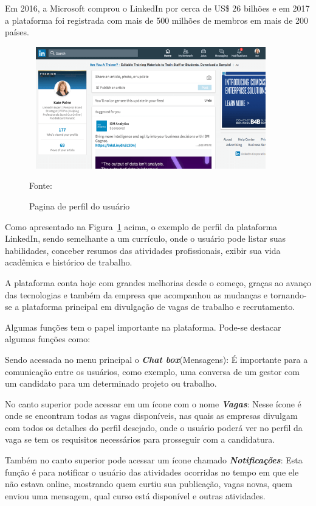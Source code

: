 Em 2016, a Microsoft comprou o LinkedIn por cerca de US\$ 26 bilhões e em 2017 a plataforma foi registrada com mais de 500 milhões de membros em mais de 200 países.

\begin{figure}[!h]
	\centering
	\caption{Pagina de perfil do usuário }
	\includegraphics[width=400px, height=200px]{./images/linkedin1.png}
		\label{fig:Pagina}
	\par {Fonte: \cite{linkedin}}
\end{figure}

Como apresentado na Figura~\hypersetup{linkcolor=black}\ref{fig:Pagina} acima, o exemplo de perfil da plataforma LinkedIn, sendo semelhante a um currículo, onde o usuário pode listar suas habilidades, conceber resumos das atividades profissionais, exibir sua vida acadêmica e histórico de trabalho.
 
A plataforma conta hoje com grandes melhorias desde o começo, graças ao avanço das tecnologias e também da empresa que acompanhou as mudanças e tornando-se a plataforma principal em divulgação de vagas de trabalho e recrutamento. 

Algumas funções tem o papel importante na plataforma. Pode-se destacar algumas funções como:

Sendo acessada no menu principal o \textbf{\emph{Chat box}}(Mensagens): É importante para a comunicação entre os usuários, como exemplo, uma conversa de um gestor com um candidato para um determinado projeto ou trabalho.

No canto superior pode acessar em um ícone com o nome \textbf{\emph{Vagas}}: Nesse ícone é onde se encontram todas as vagas disponíveis, nas quais as empresas divulgam com todos os detalhes do perfil desejado, onde o usuário poderá ver no perfil da vaga se tem os requisitos necessários para prosseguir com a candidatura. 

Também no canto superior pode acessar um ícone chamado \textbf{\emph{Notificações}}: Esta função é para notificar o usuário das atividades ocorridas no tempo em que ele não estava online, mostrando quem curtiu sua publicação, vagas novas, quem enviou uma mensagem, qual curso está disponível e outras atividades.

